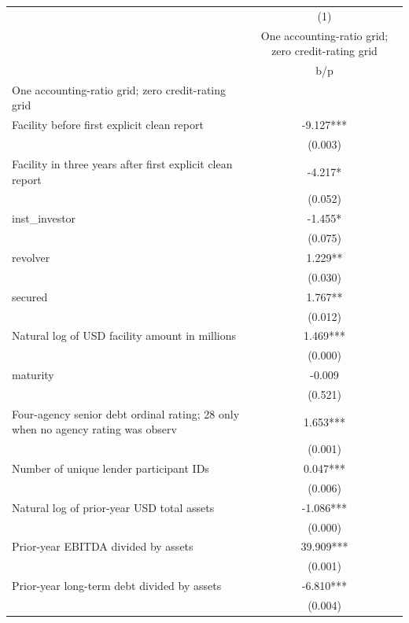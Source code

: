 {
\def\sym#1{\ifmmode^{#1}\else\(^{#1}\)\fi}
\begin{tabular}{l*{1}{c}}
\hline\hline
                    &\multicolumn{1}{c}{(1)}\\
                    &\multicolumn{1}{c}{One accounting-ratio grid; zero credit-rating grid}\\
                    &         b/p   \\
\hline
One accounting-ratio grid; zero credit-rating grid&               \\
Facility before first explicit clean report&      -9.127***\\
                    &     (0.003)   \\
Facility in three years after first explicit clean report&      -4.217*  \\
                    &     (0.052)   \\
inst\_investor       &      -1.455*  \\
                    &     (0.075)   \\
revolver            &       1.229** \\
                    &     (0.030)   \\
secured             &       1.767** \\
                    &     (0.012)   \\
Natural log of USD facility amount in millions&       1.469***\\
                    &     (0.000)   \\
maturity            &      -0.009   \\
                    &     (0.521)   \\
Four-agency senior debt ordinal rating; 28 only when no agency rating was observ&       1.653***\\
                    &     (0.001)   \\
Number of unique lender participant IDs&       0.047***\\
                    &     (0.006)   \\
Natural log of prior-year USD total assets&      -1.086***\\
                    &     (0.000)   \\
Prior-year EBITDA divided by assets&      39.909***\\
                    &     (0.001)   \\
Prior-year long-term debt divided by assets&      -6.810***\\
                    &     (0.004)   \\

\end{tabular}}
